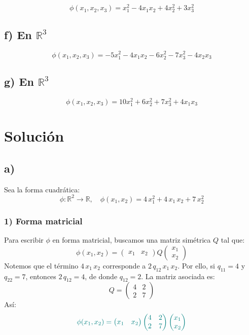 \documentclass{article}
\begin{document}
\[
\phi(x_1,x_2,x_3) = x_1^2 - 4x_1x_2 + 4x_2^2 + 3x_3^2
\]

\subsection*{f) En \(\mathbb{R}^3\)}

\[
\phi(x_1,x_2,x_3) = -5x_1^2 - 4x_1x_2 - 6x_2^2 - 7x_3^2 - 4x_2x_3
\]
\subsection*{g) En \(\mathbb{R}^3\)}

\[
\phi(x_1,x_2,x_3) = 10x_1^2 + 6x_2^2 + 7x_3^2 + 4x_1x_3
\]


\newpage
\section*{Solución}

\subsection*{a)}

Sea la forma cuadrática:
\[
\phi:\mathbb{R}^2 \to \mathbb{R},
\quad
\phi(x_1,x_2) = 4\,x_1^2 + 4\,x_1\,x_2 + 7\,x_2^2
\]

\subsubsection*{1) Forma matricial}

Para escribir \(\phi\) en forma matricial, buscamos una matriz simétrica \(Q\) tal que:
\[
\phi(x_1,x_2) =
\begin{pmatrix}
x_1 & x_2
\end{pmatrix}
Q
\begin{pmatrix}
x_1\\
x_2
\end{pmatrix}
\]
Notemos que el término \(4\,x_1\,x_2\) corresponde a \(2\,q_{12}\,x_1\,x_2\).  
Por ello, si \(q_{11} = 4\) y \(q_{22} = 7\), entonces \(2\,q_{12} = 4\), de donde \(q_{12} = 2\).  
La matriz asociada es:
\[
Q =
\begin{pmatrix}
4 & 2\\
2 & 7
\end{pmatrix}
\]
Así:
\[
\color{teal}
\phi(x_1,x_2) =
\begin{pmatrix}
x_1 & x_2
\end{pmatrix}
\begin{pmatrix}
4 & 2\\
2 & 7
\end{pmatrix}
\begin{pmatrix}
x_1\\
x_2
\end{pmatrix}
\]
\end{document}

